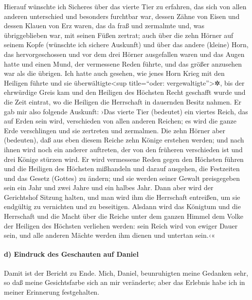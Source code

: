 Hierauf wünschte ich Sicheres über das vierte Tier zu
erfahren, das sich von allen anderen unterschied und besonders furchtbar
war, dessen Zähne von Eisen und dessen Klauen von Erz waren, das da fraß
und zermalmte und, was übriggeblieben war, mit seinen Füßen zertrat;
auch über die zehn Hörner auf seinem Kopfe (wünschte ich
sichere Auskunft) und über das andere (kleine) Horn, das
hervorgeschossen und vor dem drei Hörner ausgefallen waren und das Augen
hatte und einen Mund, der vermessene Reden führte, und das größer
anzusehen war als die übrigen. Ich hatte auch gesehen,
wie jenes Horn Krieg mit den Heiligen führte und sie
überwältigte\textless sup title=``oder: vergewaltigte''\textgreater✲,
bis der ehrwürdige Greis kam und den Heiligen des
Höchsten Recht geschafft wurde und die Zeit eintrat, wo die Heiligen die
Herrschaft in dauernden Besitz nahmen. Er gab mir also
folgende Auskunft: ›Das vierte Tier (bedeutet) ein viertes Reich, das
auf Erden sein wird, verschieden von allen anderen Reichen; es wird die
ganze Erde verschlingen und sie zertreten und zermalmen.
Die zehn Hörner aber (bedeuten), daß aus eben diesem
Reiche zehn Könige erstehen werden; und nach ihnen wird noch ein anderer
auftreten, der von den früheren verschieden ist und drei Könige stürzen
wird. Er wird vermessene Reden gegen den Höchsten führen
und die Heiligen des Höchsten mißhandeln und darauf ausgehen, die
Festzeiten und das Gesetz (Gottes) zu ändern; und sie werden seiner
Gewalt preisgegeben sein ein Jahr und zwei Jahre und ein halbes Jahr.
Dann aber wird der Gerichtshof Sitzung halten, und man
wird ihm die Herrschaft entreißen, um sie endgültig zu vernichten und zu
beseitigen. Alsdann wird das Königtum und die Herrschaft
und die Macht über die Reiche unter dem ganzen Himmel dem Volke der
Heiligen des Höchsten verliehen werden: sein Reich wird von ewiger Dauer
sein, und alle anderen Mächte werden ihm dienen und untertan sein.‹«

\hypertarget{d-eindruck-des-geschauten-auf-daniel}{%
\paragraph{d) Eindruck des Geschauten auf
Daniel}\label{d-eindruck-des-geschauten-auf-daniel}}

Damit ist der Bericht zu Ende. Mich, Daniel, beunruhigten
meine Gedanken sehr, so daß meine Gesichtsfarbe sich an mir veränderte;
aber das Erlebnis habe ich in meiner Erinnerung festgehalten.

